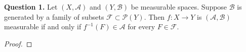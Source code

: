 \documentclass[class=book, crop=false]{standalone}
\begin{document}
    \noindent \textbf{Question 1.} Let $(X, \mathcal{A})$ and $(Y, \mathcal{B})$ be measurable spaces. Suppose $\mathcal{B}$ is generated by a family of subsets $\mathcal{F} \subset \mathcal{P}(Y)$. Then $f: X \rightarrow Y$ is $(\mathcal{A}, \mathcal{B})$ measurable if and only if $f^{-1}(F) \in \mathcal{A}$ for every $F \in \mathcal{F}$.
    \begin{proof}
        
    \end{proof}
\end{document}
